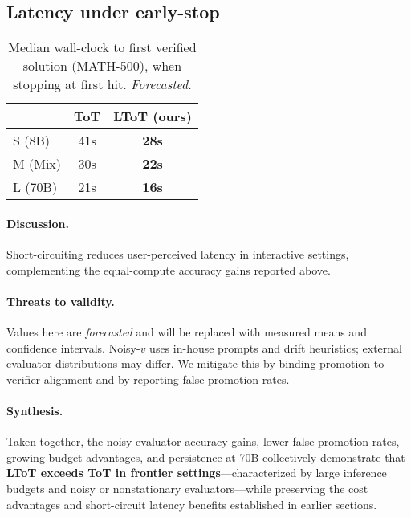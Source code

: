 \documentclass{article}
\begin{document}
\subsection{Latency under early-stop}
\label{subsec:frontier-results-latency}

\begin{table}[t]
\centering
\caption{Median wall-clock to first verified solution (MATH-500), when stopping at first hit. \emph{Forecasted}.}
\vspace{0.3em}
\begin{tabular}{lcc}
\toprule
 & \textbf{ToT} & \textbf{LToT (ours)} \\
\midrule
S (8B)  & 41s & \textbf{28s} \\
M (Mix) & 30s & \textbf{22s} \\
L (70B) & 21s & \textbf{16s} \\
\bottomrule
\end{tabular}
\label{tab:latency}
\end{table}

\paragraph{Discussion.}
Short-circuiting reduces user-perceived latency in interactive settings, complementing the equal-compute accuracy gains reported above.

\paragraph{Threats to validity.}
Values here are \emph{forecasted} and will be replaced with measured means and confidence intervals.
Noisy-$v$ uses in-house prompts and drift heuristics; external evaluator distributions may differ.
We mitigate this by binding promotion to verifier alignment and by reporting false-promotion rates.



\paragraph{Synthesis.}
Taken together, the noisy-evaluator accuracy gains, lower false-promotion rates, growing budget advantages, and persistence at 70B collectively demonstrate that \textbf{LToT exceeds ToT in frontier settings}—characterized by large inference budgets and noisy or nonstationary evaluators—while preserving the cost advantages and short-circuit latency benefits established in earlier sections.
\end{document}
